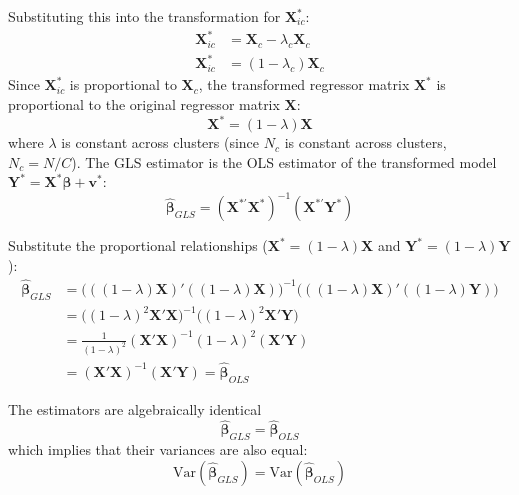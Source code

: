 \documentclass[12pt]{article}
\begin{document}
Substituting this into the transformation for $\mathbf{X}_{ic}^*$:
\begin{align}
    \mathbf{X}_{ic}^* &= \mathbf{X}_c - \lambda_c \mathbf{X}_c \\
    \mathbf{X}_{ic}^* &= (1 - \lambda_c) \mathbf{X}_c
\end{align}
Since $\mathbf{X}_{ic}^*$ is proportional to $\mathbf{X}_c$, the transformed regressor matrix $\mathbf{X}^{*}$ is proportional to the original regressor matrix $\mathbf{X}$:
\begin{equation}
    \mathbf{X}^{*} = (1 - \lambda) \mathbf{X}
\end{equation}
where $\lambda$ is constant across clusters (since $N_c$ is constant across clusters, $N_c = N/C$).
The GLS estimator is the OLS estimator of the transformed model $\mathbf{Y}^* = \mathbf{X}^* \boldsymbol{\beta} + \mathbf{v}^*$:
\begin{equation}
    \hat{\boldsymbol{\beta}}_{GLS} = (\mathbf{X}^{*'} \mathbf{X}^{*})^{-1} (\mathbf{X}^{*'} \mathbf{Y}^{*})
\end{equation}

Substitute the proportional relationships ($\mathbf{X}^* = (1-\lambda) \mathbf{X}$ and $\mathbf{Y}^* = (1-\lambda) \mathbf{Y}$):
\begin{align}
    \hat{\boldsymbol{\beta}}_{GLS} &= \bigl( ((1-\lambda) \mathbf{X})' ((1-\lambda) \mathbf{X}) \bigr)^{-1} \bigl( ((1-\lambda) \mathbf{X})' ((1-\lambda) \mathbf{Y}) \bigr) \\
    &= \bigl( (1-\lambda)^2 \mathbf{X}' \mathbf{X} \bigr)^{-1} \bigl( (1-\lambda)^2 \mathbf{X}' \mathbf{Y} \bigr) \\
    &= \frac{1}{(1-\lambda)^2} (\mathbf{X}' \mathbf{X})^{-1} (1-\lambda)^2 (\mathbf{X}' \mathbf{Y}) \\
    &= (\mathbf{X}' \mathbf{X})^{-1} (\mathbf{X}' \mathbf{Y}) = \hat{\boldsymbol{\beta}}_{OLS}
\end{align}

The estimators are algebraically identical
\begin{equation}
    \hat{\boldsymbol{\beta}}_{GLS} = \hat{\boldsymbol{\beta}}_{OLS}
\end{equation}
which implies that their variances are also equal:
\begin{equation}
    \text{Var}(\hat{\boldsymbol{\beta}}_{GLS}) = \text{Var}(\hat{\boldsymbol{\beta}}_{OLS})
\end{equation}

\newpage
\end{document}
